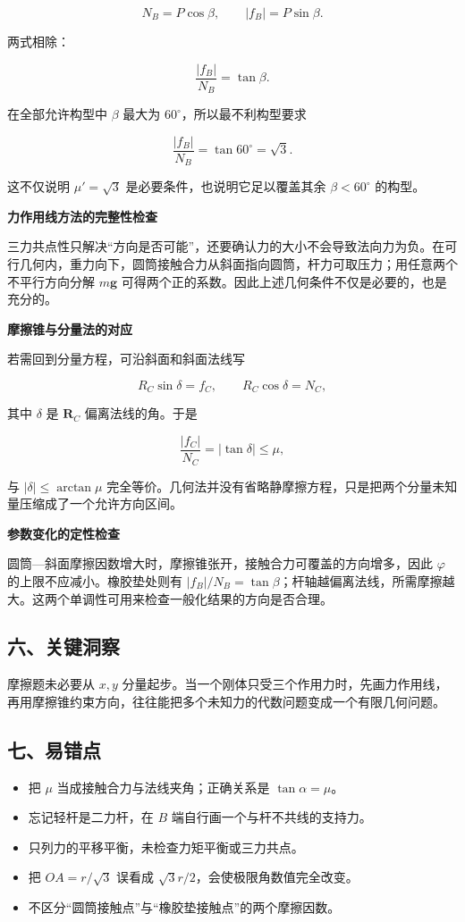 \documentclass[12pt,a4paper,UTF8]{ctexart}
\newcommand{\tightlist}{\setlength{\itemsep}{0pt}\setlength{\parskip}{0pt}}
\begin{document}
\[
N_B=P\cos\beta,
\qquad
|f_B|=P\sin\beta.
\]

两式相除：

\[
\frac{|f_B|}{N_B}=\tan\beta.
\tag{3}
\]

在全部允许构型中 \(\beta\) 最大为 \(60^\circ\)，所以最不利构型要求

\[
\frac{|f_B|}{N_B}=\tan60^\circ=\sqrt3.
\]

这不仅说明 \(\mu'=\sqrt3\) 是必要条件，也说明它足以覆盖其余
\(\beta<60^\circ\) 的构型。

\textbf{力作用线方法的完整性检查}

三力共点性只解决``方向是否可能''，还要确认力的大小不会导致法向力为负。在可行几何内，重力向下，圆筒接触合力从斜面指向圆筒，杆力可取压力；用任意两个不平行方向分解
\(m\bm g\) 可得两个正的系数。因此上述几何条件不仅是必要的，也是充分的。

\textbf{摩擦锥与分量法的对应}

若需回到分量方程，可沿斜面和斜面法线写

\[
R_C\sin\delta=f_C,
\qquad
R_C\cos\delta=N_C,
\]

其中 \(\delta\) 是 \(\bm R_C\) 偏离法线的角。于是

\[
\frac{|f_C|}{N_C}=|\tan\delta|\leq\mu,
\]

与 \(|\delta|\leq\arctan\mu\)
完全等价。几何法并没有省略静摩擦方程，只是把两个分量未知量压缩成了一个允许方向区间。

\textbf{参数变化的定性检查}

圆筒---斜面摩擦因数增大时，摩擦锥张开，接触合力可覆盖的方向增多，因此
\(\varphi\) 的上限不应减小。橡胶垫处则有
\(|f_B|/N_B=\tan\beta\)；杆轴越偏离法线，所需摩擦越大。这两个单调性可用来检查一般化结果的方向是否合理。

\subsection{六、关键洞察}\label{ux516dux5173ux952eux6d1eux5bdf}

摩擦题未必要从 \(x,y\)
分量起步。当一个刚体只受三个作用力时，先画力作用线，再用摩擦锥约束方向，往往能把多个未知力的代数问题变成一个有限几何问题。

\subsection{七、易错点}\label{ux4e03ux6613ux9519ux70b9}

\begin{itemize}
\tightlist
\item
  把 \(\mu\) 当成接触合力与法线夹角；正确关系是 \(\tan\alpha=\mu\)。
\item
  忘记轻杆是二力杆，在 \(B\) 端自行画一个与杆不共线的支持力。
\item
  只列力的平移平衡，未检查力矩平衡或三力共点。
\item
  把 \(OA=r/\sqrt3\) 误看成 \(\sqrt3r/2\)，会使极限角数值完全改变。
\item
  不区分``圆筒接触点''与``橡胶垫接触点''的两个摩擦因数。
\end{itemize}
\end{document}

